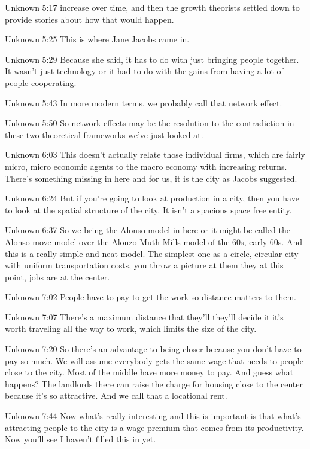 Unknown 5:17
increase over time, and then the growth theorists settled down to provide stories about how that would happen.

Unknown 5:25
This is where Jane Jacobs came in.

Unknown 5:29
Because she said, it has to do with just bringing people together. It wasn't just technology or it had to do with the gains from having a lot of people cooperating.

Unknown 5:43
In more modern terms, we probably call that network effect.

Unknown 5:50
So network effects may be the resolution to the contradiction in these two theoretical frameworks we've just looked at.

Unknown 6:03
This doesn't actually relate those individual firms, which are fairly micro, micro economic agents to the macro economy with increasing returns. There's something missing in here and for us, it is the city as Jacobs suggested.

Unknown 6:24
But if you're going to look at production in a city, then you have to look at the spatial structure of the city. It isn't a spacious space free entity.

Unknown 6:37
So we bring the Alonso model in here or it might be called the Alonso move model over the Alonzo Muth Mills model of the 60s, early 60s. And this is a really simple and neat model. The simplest one as a circle, circular city with uniform transportation costs, you throw a picture at them they at this point, jobs are at the center.

Unknown 7:02
People have to pay to get the work so distance matters to them.

Unknown 7:07
There's a maximum distance that they'll they'll decide it it's worth traveling all the way to work, which limits the size of the city.

Unknown 7:20
So there's an advantage to being closer because you don't have to pay so much. We will assume everybody gets the same wage that needs to people close to the city. Most of the middle have more money to pay. And guess what happens? The landlords there can raise the charge for housing close to the center because it's so attractive. And we call that a locational rent.

Unknown 7:44
Now what's really interesting and this is important is that what's attracting people to the city is a wage premium that comes from its productivity. Now you'll see I haven't filled this in yet.

